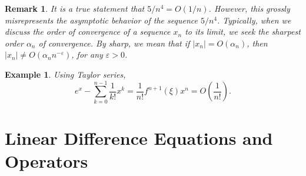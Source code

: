 \documentclass[12pt,reqno]{amsart}
\numberwithin{equation}{section}  %
\newcommand{\ee}{\varepsilon}
\newtheorem{remark}[theorem]{Remark}
\newtheorem{example}{Example}[section]
\begin{document}
\begin{remark}
It is a true statement that $5/n^4 = O(1/n)$. However, this grossly
misrepresents the asymptotic behavior of the sequence $5/n^4$. Typically, when
we discuss the order of convergence of a sequence $x_n$ to its limit, we seek
the sharpest order $\alpha_n$ of convergence. By sharp, we mean that if $|x_n| =
O(\alpha_n)$, then $|x_n| \neq O(\alpha_n n^{-\ee})$, for any $\ee > 0$.
\end{remark}

\begin{example}
Using Taylor series,
\begin{equation*}
e^x - \sum_{k = 0}^{n-1} \frac{1}{k!}x^k = \frac{1}{n!} f^{n+1}(\xi)x^n =
O\left(\frac{1}{n!}\right).
\end{equation*}
\end{example}

\section{Linear Difference Equations and Operators}
\end{document}
